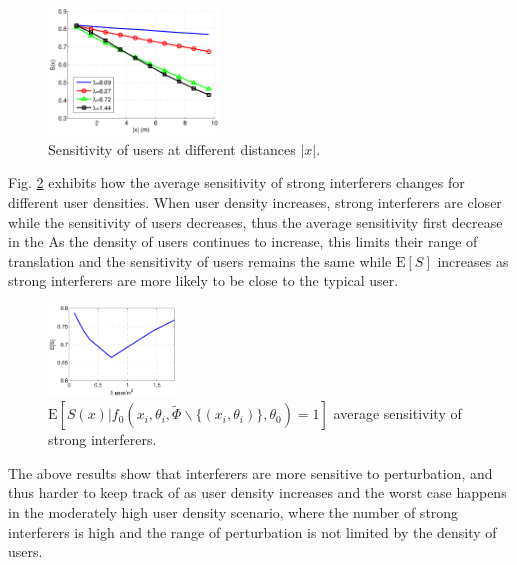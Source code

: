\documentclass[10pt, conference, letterpaper]{IEEEtran}
\begin{document}
\begin{figure}
	\centering
	\includegraphics[width = 0.4\textwidth]{Channel_sensitivity.pdf}
	\caption{Sensitivity of users at different distances $|x|$.}
	\label{fig:Channel_sensitivity}
\end{figure}

Fig. \ref{fig:Channel_sensitivity_average} exhibits how the average sensitivity of strong interferers changes for different user densities. When user density increases, strong interferers are closer while the sensitivity of users decreases, thus the average sensitivity first decrease in the As the density of users continues to increase, this limits their range of translation and the sensitivity of users remains the same while $\mathrm{E}[S]$ increases as strong interferers are more likely to be close to the typical user. 

\begin{figure}
	\centering
	\includegraphics[width = 0.3\textwidth]{Channel_sensitivity_average.pdf}
	\caption{$\mathrm{E}[S(x)|f_0(x_i, \theta_i, \tilde{\Phi}\backslash\{(x_i,\theta_i)\}, \theta_0)=1]$ average sensitivity of strong interferers.}
	\label{fig:Channel_sensitivity_average}
\end{figure}

The above results show that interferers are more sensitive to perturbation, and thus harder to keep track of as user density increases and the worst case happens in the moderately high user density scenario, where the number of strong interferers is high and the range of perturbation is not limited by the density of users. 
\end{document}
